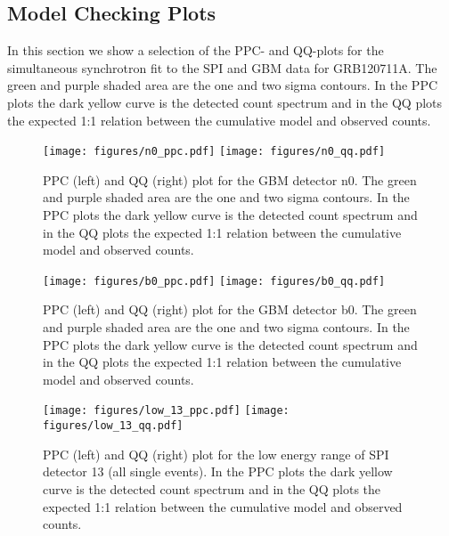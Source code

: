 \documentclass[twocolumn,traditabstract]{aa}
\begin{document}



\begin{appendix}
\onecolumn
  \section{Model Checking Plots}
  \label{appendix}
  In this section we show a selection of the PPC- and QQ-plots for the simultaneous synchrotron fit to the SPI and GBM data for GRB120711A. The green and purple shaded area are the one and two sigma contours. In the PPC plots the dark yellow curve is the detected count spectrum and in the QQ plots the expected 1:1 relation between the cumulative model and observed counts.

  \begin{figure*}[ht]
    \begin{centering}
      \texttt{[image: figures/n0\_ppc.pdf]}
      \texttt{[image: figures/n0\_qq.pdf]}
      \caption{PPC (left) and QQ (right) plot for the GBM detector n0. The green and purple shaded area are the one and two sigma contours. In the PPC plots the dark yellow curve is the detected count spectrum and in the QQ plots the expected 1:1 relation between the cumulative model and observed counts.}
      \label{fig:n0_model_check}
    \end{centering}
  \end{figure*}
  \begin{figure*}[ht]
    \begin{centering}
      \texttt{[image: figures/b0\_ppc.pdf]}
      \texttt{[image: figures/b0\_qq.pdf]}
      \caption{PPC (left) and QQ (right) plot for the GBM detector b0. The green and purple shaded area are the one and two sigma contours. In the PPC plots the dark yellow curve is the detected count spectrum and in the QQ plots the expected 1:1 relation between the cumulative model and observed counts.}
      \label{fig:b0_model_check}
    \end{centering}
  \end{figure*}

  \begin{figure*}[ht]
    \begin{centering}
      \texttt{[image: figures/low\_13\_ppc.pdf]}
      \texttt{[image: figures/low\_13\_qq.pdf]}
      \caption{PPC (left) and QQ (right) plot for the low energy range of SPI detector 13 (all single events). In the PPC plots the dark yellow curve is the detected count spectrum and in the QQ plots the expected 1:1 relation between the cumulative model and observed counts.}
      \label{fig:low_13_model_check}
    \end{centering}
  \end{figure*}


\end{appendix}
\end{document}
